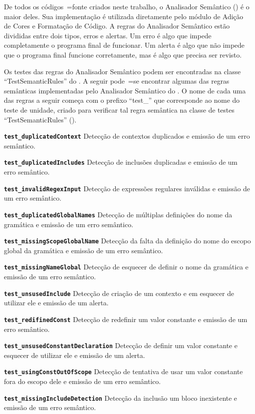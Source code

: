 De todos os códigos~=fonte criados neste trabalho,
o Analisador Semântico () é o maior deles.
Sua implementação é utilizada diretamente pelo módulo de Adição de Cores e
Formatação de Código.
A regras do Analisador Semântico estão divididas entre dois tipos,
erros e
alertas.
Um erro é algo que impede completamente o programa final de funcionar.
Um alerta é algo que não impede que o programa final funcione corretamente,
mas é algo que precisa ser revisto.

Os testes das regras do Analisador Semântico podem ser encontradas na classe ``TestSemanticRules'' do .
A seguir pode~=se encontrar algumas das regras semânticas implementadas pelo Analisador Semântico do .
O nome de cada uma das regras a seguir começa com o prefixo ``test\_'' que corresponde ao nome do teste de unidade,
criado para verificar tal regra semântica na classe de testes ``TestSemanticRules'' ().
\begin{enumerateoptional}[1.]
\item[\bfseries\texttt{test_duplicatedContext}] Detecção de contextos duplicados e
emissão de um erro semântico.
\item[\bfseries\texttt{test_duplicatedIncludes}] Detecção de inclusões duplicadas  e
emissão de um erro semântico.
\item[\bfseries\texttt{test_invalidRegexInput}] Detecção de expressões regulares inválidas e
emissão de um erro semântico.
\item[\bfseries\texttt{test_duplicatedGlobalNames}] Detecção de múltiplas definições do nome da gramática e
emissão de um erro semântico.
\item[\bfseries\texttt{test_missingScopeGlobalName}] Detecção da falta da definição do nome do escopo global da gramática e
emissão de um erro semântico.
\item[\bfseries\texttt{test_missingNameGlobal}] Detecção de esquecer de definir o nome da gramática e
emissão de um erro semântico.
\item[\bfseries\texttt{test_unsusedInclude}] Detecção de criação de um contexto e
em esquecer de utilizar ele e
emissão de um alerta.
\item[\bfseries\texttt{test_redifinedConst}] Detecção de redefinir um valor constante e
emissão de um erro semântico.
\item[\bfseries\texttt{test_unsusedConstantDeclaration}] Detecção de definir um valor constante e esquecer de utilizar ele e
emissão de um alerta.
\item[\bfseries\texttt{test_usingConstOutOfScope}] Detecção de tentativa de usar um valor constante fora do escopo dele e
emissão de um erro semântico.
\item[\bfseries\texttt{test_missingIncludeDetection}] Detecção da inclusão um bloco inexistente e
emissão de um erro semântico.
\end{enumerateoptional}%
